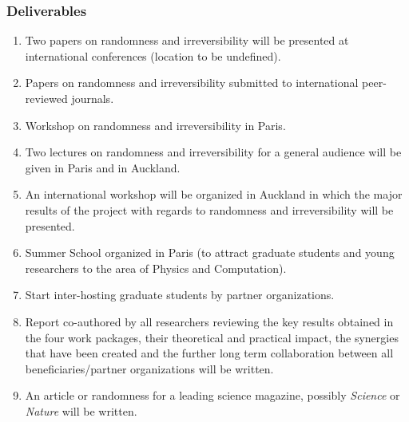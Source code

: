 \documentclass[12pt]{article}
\begin{document}
%
%



\subsubsection*{Deliverables}
\renewcommand{\labelenumi}{D4.\arabic{enumi}:}
\begin{enumerate}

\item Two papers on randomness and irreversibility will be presented at  international conferences (location to be undefined).
\item Papers on randomness and irreversibility  submitted to international peer-reviewed journals.
\item Workshop on randomness and irreversibility in Paris.
\item Two lectures on randomness and irreversibility for a general audience will  be given in Paris and  in Auckland.
\item
An international workshop will be organized in Auckland in which the major
results of the project with regards to randomness and irreversibility will be presented.

\item Summer School organized in Paris (to attract graduate students and young researchers
to the area of Physics and Computation).

\item Start  inter-hosting graduate students by partner organizations.

\item Report co-authored by all researchers reviewing the key results obtained in the four work packages, their theoretical and practical impact, the synergies that have been created and the further long term collaboration between all beneficiaries/partner organizations will be written.

\item An article or randomness for a leading science magazine, possibly {\em Science} or {\em Nature} will be  written.

\end{enumerate}
\end{document}

